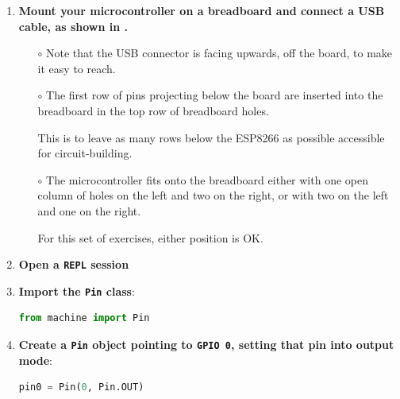\begin{enumerate}
	\item \textbf{Mount your microcontroller on a breadboard and connect a USB cable, as shown in .} 
	
	\begin{itemize}
		\item[$\circ$] Note that the USB connector is facing upwards, off the board, to make it easy to reach. 
		\item[$\circ$] The first row of pins projecting below the board are inserted into the breadboard in the top row of breadboard holes. 
		
		This is to leave as many rows below the ESP8266 as possible accessible for circuit-building. 
	
		\item[$\circ$] The microcontroller fits onto the breadboard either with one open column of holes on the left and two on the right, or with two on the left and one on the right. 
		
		\smallskip
		For this set of exercises, either position is OK.
	\end{itemize} 

	\item \textbf{Open a \texttt{REPL} session}
	
	\item \textbf{Import the \texttt{Pin} class}:%
\begin{lstlisting}[language=Python]
from machine import Pin 
\end{lstlisting}	

	\item \textbf{Create a \texttt{Pin} object pointing to \texttt{GPIO 0}, setting that pin into output mode}:
\begin{lstlisting}[language=Python]
pin0 = Pin(0, Pin.OUT) 
\end{lstlisting}	
	

\end{enumerate}

